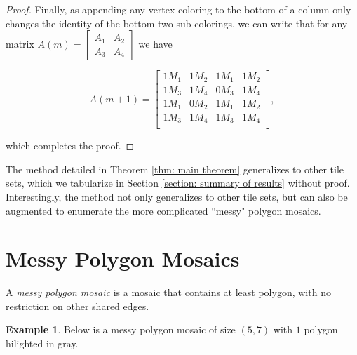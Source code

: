 \documentclass[12pt]{article}
\theoremstyle{plain}
\theoremstyle{definition}
\theoremstyle{remark}
\theoremstyle{definition}
\newtheorem{exmp}{Example}[section]
\newcommand{\cell}[4]{ \draw[thick] ( #1 , #2 ) rectangle ( #3 , #4 );}
\newcommand{\cellA}[4]{ \draw[thick] ( #1 , #2 ) rectangle ( #3 , #4 ); \draw[red, thick, densely dotted] (#3 * 0.5 + #1 * 0.5 , #2) -- (#3, #4 * 0.5 + #2 * 0.5);}
\newcommand{\cellB}[4]{ \draw[thick] ( #1 , #2 ) rectangle ( #3 , #4 ); \draw[red, thick, densely dotted] (#3 * 0.5 + #1 * 0.5 , #2) -- (#1, #4 * 0.5 + #2 * 0.5);}
\newcommand{\cellC}[4]{ \draw[thick] ( #1 , #2 ) rectangle ( #3 , #4 ); \draw[red, thick, densely dotted] (#3 * 0.5 + #1 * 0.5 , #4) -- (#1, #4 * 0.5 + #2 * 0.5);}
\newcommand{\cellD}[4]{ \draw[thick] ( #1 , #2 ) rectangle ( #3 , #4 ); \draw[red, thick, densely dotted] (#3 * 0.5 + #1 * 0.5 , #4) -- (#3, #4 * 0.5 + #2 * 0.5);}
\newcommand{\cellE}[4]{ \draw[thick] ( #1 , #2 ) rectangle ( #3 , #4 ); \draw[red, thick, densely dotted] (#3 * 0.5 + #1 * 0.5 , #2) -- (#3 * 0.5 + #1 * 0.5 , #4);}
\newcommand{\cellF}[4]{ \draw[thick] ( #1 , #2 ) rectangle ( #3 , #4 ); \draw[red, thick, densely dotted] (#3, #4 * 0.5 + #2 * 0.5) -- (#1, #4 * 0.5 + #2 * 0.5);}
\newcommand{\cellAf}[4]{\filldraw[gray!40] ( #1 , #2 ) rectangle ( #3 , #4 ); \draw[thick] ( #1 , #2 ) rectangle ( #3 , #4 ); \draw[red, thick, densely dotted] (#3 * 0.5 + #1 * 0.5 , #2) -- (#3, #4 * 0.5 + #2 * 0.5);}
\newcommand{\cellBf}[4]{\filldraw[gray!40] ( #1 , #2 ) rectangle ( #3 , #4 ); \draw[thick] ( #1 , #2 ) rectangle ( #3 , #4 ); \draw[red, thick, densely dotted] (#3 * 0.5 + #1 * 0.5 , #2) -- (#1, #4 * 0.5 + #2 * 0.5);}
\newcommand{\cellCf}[4]{\filldraw[gray!40] ( #1 , #2 ) rectangle ( #3 , #4 ); \draw[thick] ( #1 , #2 ) rectangle ( #3 , #4 ); \draw[red, thick, densely dotted] (#3 * 0.5 + #1 * 0.5 , #4) -- (#1, #4 * 0.5 + #2 * 0.5);}
\newcommand{\cellDf}[4]{\filldraw[gray!40] ( #1 , #2 ) rectangle ( #3 , #4 ); \draw[thick] ( #1 , #2 ) rectangle ( #3 , #4 ); \draw[red, thick, densely dotted] (#3 * 0.5 + #1 * 0.5 , #4) -- (#3, #4 * 0.5 + #2 * 0.5);}
\newcommand{\cellEf}[4]{\filldraw[gray!40] ( #1 , #2 ) rectangle ( #3 , #4 ); \draw[thick] ( #1 , #2 ) rectangle ( #3 , #4 ); \draw[red, thick, densely dotted] (#3 * 0.5 + #1 * 0.5 , #2) -- (#3 * 0.5 + #1 * 0.5 , #4);}
\newcommand{\cellFf}[4]{\filldraw[gray!40] ( #1 , #2 ) rectangle ( #3 , #4 ); \draw[thick] ( #1 , #2 ) rectangle ( #3 , #4 ); \draw[red, thick, densely dotted] (#3, #4 * 0.5 + #2 * 0.5) -- (#1, #4 * 0.5 + #2 * 0.5);}
\begin{document}
\begin{proof}
Finally, as appending any vertex coloring to the bottom of a column only changes the identity of the bottom two sub-colorings, we can write that for any matrix $A(m) =\begin{bmatrix} A_1 & A_2 \\ A_3 & A_4 \end{bmatrix}$ we have 

$$
A(m+1) = 
\begin{bmatrix}
    1M_1 & 1M_2 & 1M_1 & 1M_2 \\
    1M_3 & 1M_4 & 0M_3 & 1M_4 \\
    1M_1 & 0M_2 & 1M_1 & 1M_2 \\
    1M_3 & 1M_4 & 1M_3 & 1M_4 \\
\end{bmatrix},
$$

which completes the proof.

\end{proof}

The method detailed in Theorem \ref{thm: main theorem} generalizes to other tile sets, which we tabularize in Section \ref{section: summary of results} without proof. Interestingly, the method not only generalizes to other tile sets, but can also be augmented to enumerate the more complicated ``messy" polygon mosaics.

\section{Messy Polygon Mosaics}

A \textit{messy polygon mosaic} is a mosaic that contains at least polygon, with no restriction on other shared edges. 

\begin{exmp}
\label{exmp: messy sap}
Below is a messy polygon mosaic of size $(5,7)$ with $1$ polygon hilighted in gray. 

\begin{center}
\end{center}
\end{exmp}
\end{document}
